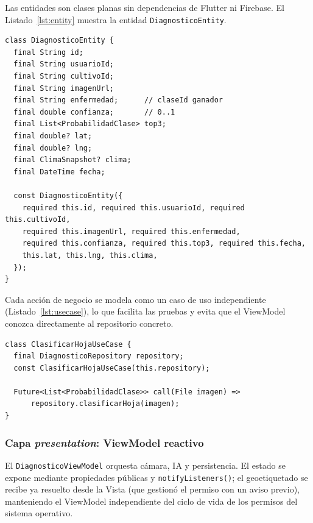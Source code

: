 \documentclass[12pt,a4paper]{article}
\begin{document}
Las entidades son clases planas sin dependencias de Flutter ni Firebase. El
Listado~\ref{lst:entity} muestra la entidad \texttt{DiagnosticoEntity}.

\begin{lstlisting}[caption={Entidad de dominio del diagnóstico}, label={lst:entity}]
class DiagnosticoEntity {
  final String id;
  final String usuarioId;
  final String cultivoId;
  final String imagenUrl;
  final String enfermedad;      // claseId ganador
  final double confianza;       // 0..1
  final List<ProbabilidadClase> top3;
  final double? lat;
  final double? lng;
  final ClimaSnapshot? clima;
  final DateTime fecha;

  const DiagnosticoEntity({
    required this.id, required this.usuarioId, required this.cultivoId,
    required this.imagenUrl, required this.enfermedad,
    required this.confianza, required this.top3, required this.fecha,
    this.lat, this.lng, this.clima,
  });
}
\end{lstlisting}

Cada acción de negocio se modela como un caso de uso independiente
(Listado~\ref{lst:usecase}), lo que facilita las pruebas y evita que el
ViewModel conozca directamente al repositorio concreto.

\begin{lstlisting}[caption={Caso de uso: clasificar una hoja}, label={lst:usecase}]
class ClasificarHojaUseCase {
  final DiagnosticoRepository repository;
  const ClasificarHojaUseCase(this.repository);

  Future<List<ProbabilidadClase>> call(File imagen) =>
      repository.clasificarHoja(imagen);
}
\end{lstlisting}

\subsubsection{Capa \textit{presentation}: ViewModel reactivo}

El \texttt{DiagnosticoViewModel} orquesta cámara, IA y persistencia. El estado
se expone mediante propiedades públicas y \texttt{notifyListeners()}; el
geoetiquetado se recibe ya resuelto desde la Vista (que gestionó el permiso con
un aviso previo), manteniendo el ViewModel independiente del ciclo de vida de
los permisos del sistema operativo.
\end{document}

